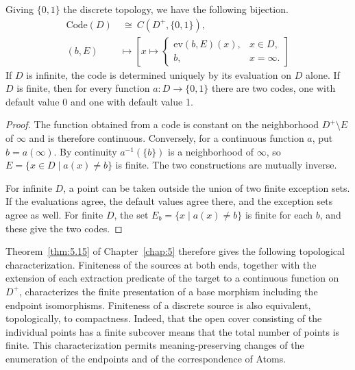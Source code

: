 \begin{proposition}\label{prop:8.2}

Giving $\{0,1\}$ the discrete topology, we have the following bijection.
\begin{equation*}
\begin{aligned}
\mathrm{Code}(D)&\ \cong\ C(D^+,\{0,1\}),\\
(b,E)&\longmapsto
\left[
x\longmapsto
\begin{cases}
\mathrm{ev}(b,E)(x),&x\in D,\\
b,&x=\infty.
\end{cases}
\right]
\end{aligned}
\tag{8.2}\label{eq:8.2}
\end{equation*}
If $D$ is infinite, the code is determined uniquely by its evaluation on $D$ alone.
If $D$ is finite, then for every function $a:D\to\{0,1\}$ there are two codes, one with
default value 0 and one with default value 1.

\end{proposition}

\begin{proof}

The function obtained from a code is constant on the neighborhood $D^+\setminus E$ of
$\infty$ and is therefore continuous.
Conversely, for a continuous function $a$, put $b=a(\infty)$.
By continuity $a^{-1}(\{b\})$ is a neighborhood of $\infty$, so
$E=\{x\in D\mid a(x)\ne b\}$ is finite. The two constructions are mutually inverse.

For infinite $D$, a point can be taken outside the union of two finite exception sets.
If the evaluations agree, the default values agree there, and the exception sets agree as
well.
For finite $D$, the set $E_b=\{x\mid a(x)\ne b\}$ is finite for each $b$, and these give the
two codes.

\end{proof}

Theorem~\ref{thm:5.15} of Chapter~\ref{chap:5} therefore gives the following topological
characterization. Finiteness of the sources at both ends, together with the extension of each
extraction predicate of the target to a continuous function on $D^+$, characterizes the
finite presentation of a base morphism including the endpoint isomorphisms.
Finiteness of a discrete source is also equivalent, topologically, to compactness.
Indeed, that the open cover consisting of the individual points has a finite subcover means
that the total number of points is finite.
This characterization permits meaning-preserving changes of the enumeration of the
endpoints and of the correspondence of Atoms.


